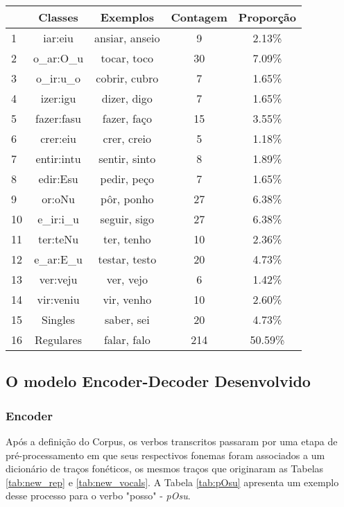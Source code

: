 \begin{table}[H]
\begin{center}
\begin{tabular}{|l|c|c|c|c|}
\toprule
& Classes & Exemplos & Contagem & Proporção\\
\midrule
1 & iar:eiu & ansiar, anseio & 9 & 2.13\%\\
2 & o\_ar:O\_u & tocar, toco & 30 & 7.09\%\\
3 & o\_ir:u\_o & cobrir, cubro & 7 & 1.65\%\\
4 & izer:igu & dizer, digo & 7 & 1.65\%\\
5 & fazer:fasu & fazer, faço & 15 & 3.55\%\\
6 & crer:eiu & crer, creio & 5 & 1.18\%\\
7 & entir:intu & sentir, sinto & 8 & 1.89\% \\
8 & edir:Esu & pedir, peço & 7 & 1.65\%\\
9 & or:oNu & pôr, ponho & 27 & 6.38\%\\
10 & e\_ir:i\_u & seguir, sigo & 27 & 6.38\%\\
11 & ter:teNu & ter, tenho & 10 & 2.36\%\\
12 & e\_ar:E\_u & testar, testo & 20 & 4.73\%\\
13 & ver:veju & ver, vejo & 6 & 1.42\%\\
14 & vir:veniu & vir, venho & 10 & 2.60\%\\
15 & Singles & saber, sei & 20 & 4.73\%\\
16 & Regulares & falar, falo & 214 & 50.59\%\\
\bottomrule
\end{tabular}
\end{center}
\label{tab:classes}
\end{table}

\subsection{O modelo Encoder-Decoder Desenvolvido}

\subsubsection{Encoder}
\label{sec:inputs}

Após a definição do Corpus, os verbos transcritos passaram por uma etapa de pré-processamento em que seus respectivos fonemas foram associados a um dicionário de traços fonéticos, os mesmos traços que originaram as Tabelas \ref{tab:new_rep} e \ref{tab:new_vocals}. A Tabela \ref{tab:pOsu} apresenta um exemplo desse processo para o verbo "posso" - \textit{pOsu}. 


